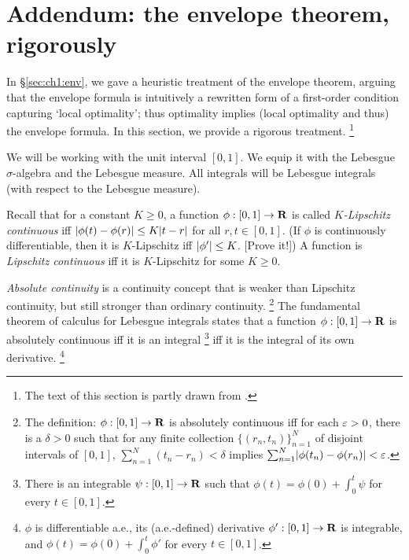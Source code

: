 \section{Addendum: the envelope theorem, rigorously}
\label{sec:ch1:envelope_rigorous}

In §\ref{sec:ch1:env}, we gave a heuristic treatment of the envelope theorem, arguing that the envelope formula is intuitively a rewritten form of a first-order condition capturing `local optimality'; thus optimality implies (local optimality and thus) the envelope formula.
In this section, we provide a rigorous treatment.%
	\footnote{The text of this section is partly drawn from \textcite{Sinander2022}.}


\begin{namedthm}[Formalities.]
	\label{namedthm:formalities_env}
	We will be working with the unit interval $[0,1]$. We equip it with the Lebesgue $\sigma$-algebra and the Lebesgue measure. All integrals will be Lebesgue integrals (with respect to the Lebesgue measure).

	Recall that for a constant $K \geq 0$, a function $\phi : [0,1] \to \mathbf{R}$ is called \emph{$K$-Lipschitz continuous} iff
	$\abs*{ \phi(t) - \phi(r) } \leq K\abs*{t-r}$ for all $r,t \in [0,1]$. (If $\phi$ is continuously differentiable, then it is $K$-Lipschitz iff $\abs*{\phi'} \leq K$. [Prove it!])
	A function is \emph{Lipschitz continuous} iff it is $K$-Lipschitz for some $K \geq 0$.

	\emph{Absolute continuity} is a continuity concept that is weaker than Lipschitz continuity, but still stronger than ordinary continuity.%
		\footnote{The definition:
		$\phi : [0,1] \to \mathbf{R}$ is absolutely continuous iff for each $\varepsilon > 0$, there is a $\delta > 0$ such that for any finite collection $\{ (r_n,t_n) \}_{n=1}^N$ of disjoint intervals of $[0,1]$,
		$\sum_{n=1}^N ( t_n - r_n ) < \delta$ implies $\sum_{n=1}^N \abs*{ \phi(t_n) - \phi(r_n) } < \eps$.}
	The fundamental theorem of calculus for Lebesgue integrals
	\parencite[see e.g.][§3.5, p. 106]{Folland1999}
	states that
	a function $\phi : [0,1] \to \mathbf{R}$
	is absolutely continuous
	iff it is an integral%
		\footnote{There is an integrable $\psi : [0,1] \to \mathbf{R}$ such that $\phi(t) = \phi(0) + \int_0^t \psi$ for every $t \in [0,1]$.}
	iff it is the integral of its own derivative.%
		\footnote{$\phi$ is differentiable a.e., its (a.e.-defined) derivative $\phi' : [0,1] \to \mathbf{R}$ is integrable, and $\phi(t) = \phi(0) + \int_0^t \phi'$ for every $t \in [0,1]$.}
\end{namedthm}


